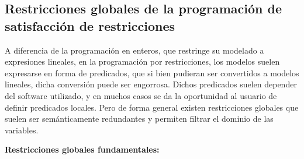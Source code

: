 \documentclass[12pt]{report}
\begin{document}
\subsection{Restricciones globales de la programación de satisfacción de restricciones}

A diferencia de la programación en enteros, que restringe su modelado a expresiones lineales, en la programación por restricciones, los modelos suelen expresarse en forma de predicados, que si bien pudieran ser convertidos a modelos lineales, dicha conversión puede ser engorrosa. Dichos predicados suelen depender del software utilizado, y en muchos casos se da la oportunidad al usuario de definir predicados locales. Pero de forma general existen restricciones globales que suelen ser semánticamente redundantes y permiten filtrar el dominio de las variables.


\textbf{Restricciones globales fundamentales:}\\
\end{document}
